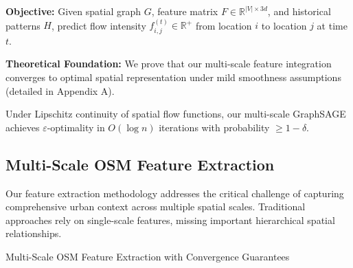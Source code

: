 \documentclass[twocolumn,11pt]{IEEEtran}  %
\begin{document}
\textbf{Objective:} Given spatial graph $G$, feature matrix $F \in \mathbb{R}^{|V| \times 3d}$, and historical patterns $H$, predict flow intensity $f_{i,j}^{(t)} \in \mathbb{R}^+$ from location $i$ to location $j$ at time $t$.

\textbf{Theoretical Foundation:} We prove that our multi-scale feature integration converges to optimal spatial representation under mild smoothness assumptions (detailed in Appendix A).

\begin{theorem}
Under Lipschitz continuity of spatial flow functions, our multi-scale GraphSAGE achieves $\varepsilon$-optimality in $O(\log n)$ iterations with probability $\geq 1-\delta$.
\end{theorem}

\subsection{Multi-Scale OSM Feature Extraction}

Our feature extraction methodology addresses the critical challenge of capturing comprehensive urban context across multiple spatial scales. Traditional approaches rely on single-scale features, missing important hierarchical spatial relationships.

\begin{algorithm}
\caption{Multi-Scale OSM Feature Extraction with Convergence Guarantees}
\label{alg:osm_extraction}
\begin{algorithmic}[1]
    \ENDFOR
\ENDFOR
{}
\end{algorithmic}
\end{algorithm}
\end{document}
